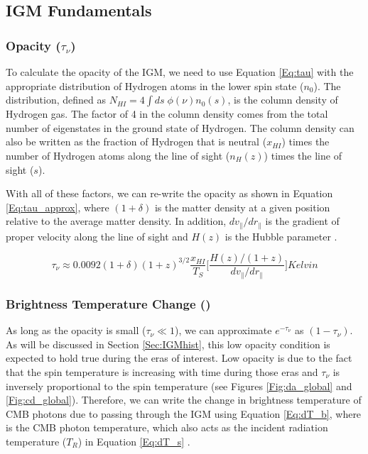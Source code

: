 \subsection{IGM Fundamentals}

\subsubsection{Opacity ($\tau_\nu$)}

To calculate the opacity of the IGM, we need to use Equation \ref{Eq:tau} with the appropriate distribution of Hydrogen atoms in the lower spin state ($n_0$). The distribution, defined as $N_{HI} = 4 \int ds \; \phi(\nu) n_0(s)$, is the column density of Hydrogen gas. The factor of 4 in the column density comes from the total number of eigenstates in the ground state of Hydrogen. The column density can also be written as the fraction of Hydrogen that is neutral ($x_{HI}$) times the number of Hydrogen atoms along the line of sight ($n_H (z)$) times the line of sight ($s$).

With all of these factors, we can re-write the opacity as shown in Equation \ref{Eq:tau_approx}, where $(1+\delta)$ is the matter density at a given position relative to the average matter density. In addition, $dv_{\parallel}/dr_{\parallel}$ is the gradient of proper velocity along the line of sight and $H(z)$ is the Hubble parameter \cite{furlanetto_2006}. 

\begin{equation} \label{Eq:tau_approx}
\tau_{\nu} \approx 0.0092 (1+\delta) (1+z)^{3/2} \frac{x_{HI}}{T_S} \Big[ \frac{H(z)/(1+z)}{dv_{\parallel}/dr_{\parallel}} \Big] Kelvin
\end{equation} 



\subsubsection{Brightness Temperature Change (\dtb)}

As long as the opacity is small ($\tau_\nu \ll 1$), we can approximate $e^{-\tau_\nu}$ as $(1-\tau_\nu)$. As will be discussed in Section \ref{Sec:IGMhist}, this low opacity condition is expected to hold true during the eras of interest. Low opacity is due to the fact that the spin temperature is increasing with time during those eras and $\tau_\nu$ is inversely proportional to the spin temperature (see Figures \ref{Fig:da_global} and \ref{Fig:cd_global}). Therefore, we can write the change in brightness temperature of CMB photons due to passing through the IGM using Equation \ref{Eq:dT_b}, where \tg is the CMB photon temperature, which also acts as the incident radiation temperature ($T_R$) in Equation \ref{Eq:dT_s} \cite{furlanetto_2006}. 


